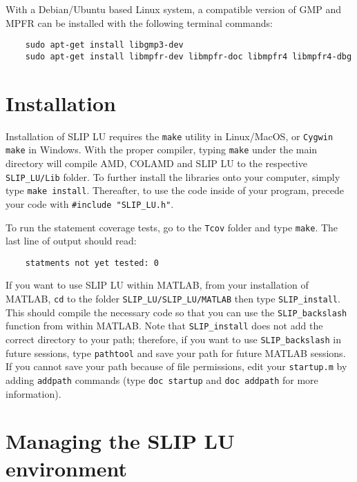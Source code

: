 \documentclass[12pt]{article}
\theoremstyle{definition}
\begin{document}
With a Debian/Ubuntu based Linux system, a compatible version of GMP and MPFR
can be installed with the following terminal commands:

{\small
\begin{verbatim}
    sudo apt-get install libgmp3-dev
    sudo apt-get install libmpfr-dev libmpfr-doc libmpfr4 libmpfr4-dbg
\end{verbatim} }

\section{Installation} \label{s:install}

Installation of SLIP LU requires the \verb|make| utility in Linux/MacOS, or
\verb|Cygwin make| in Windows. With the proper compiler, typing \verb|make|
under the main directory will compile AMD, COLAMD and SLIP LU to the respective
\verb|SLIP_LU/Lib| folder. To further install the libraries onto your computer,
simply type \verb|make install|.  Thereafter, to use the code inside of your
program, precede your code with \verb|#include "SLIP_LU.h"|.

To run the statement coverage tests, go to the \verb|Tcov| folder and
type \verb|make|.  The last line of output should read:

\begin{verbatim}
    statments not yet tested: 0
\end{verbatim}

If you want to use SLIP LU within MATLAB, from your installation of MATLAB,
\verb|cd| to the folder \verb|SLIP_LU/SLIP_LU/MATLAB| then type
\verb|SLIP_install|. This should compile the necessary code so that you can use
the \verb|SLIP_backslash| function from within MATLAB. Note that
\verb|SLIP_install| does not add the correct directory to your path; therefore,
if you want to use \verb|SLIP_backslash| in future sessions, type
\verb|pathtool| and save your path for future MATLAB sessions. If you cannot
save your path because of file permissions, edit your \verb|startup.m| by
adding \verb|addpath| commands (type \verb|doc startup| and \verb|doc addpath|
for more information).

\section{Managing the SLIP LU environment} \label{s:user:setup}
\end{document}
